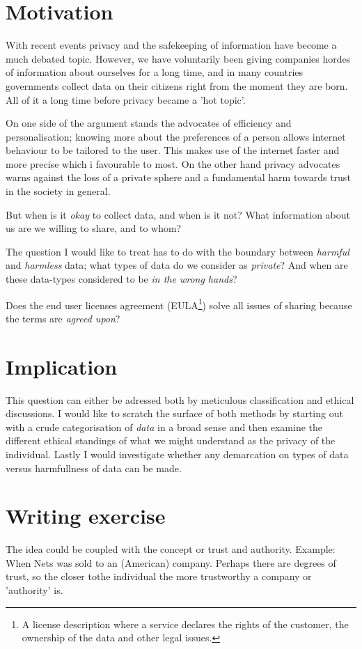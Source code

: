 \documentclass{article}
\begin{document}
\section{Motivation}
With recent events privacy and the safekeeping of information have become a
much debated topic. However, we have voluntarily been giving companies
hordes of information about ourselves for a long time, and in many
countries governments collect data on their citizens right from
the moment they are born.
All of it a long time before privacy became a 'hot topic'.

On one side of the argument stands the advocates of efficiency
and personalisation; knowing more about the preferences of a person
allows internet behaviour to be tailored to the user.
This makes use of the internet faster and more precise which i
favourable to most.
On the other hand privacy advocates warns against the loss of a
private sphere and a fundamental harm towards trust in the
society in general.

But when is it \textit{okay} to collect data, and when is it not?
What information about us are we willing to share, and to whom?

The question I would like to treat has to do with the boundary between 
\textit{harmful} and \textit{harmless} data; what types of data do we
consider as \textit{private}? And when are these data-types considered 
to be \textit{in the wrong hands}? 

Does the end user licenses agreement (EULA\footnote{A license description
where a service declares the rights of the customer, the ownership of
the data and other legal issues.}) solve all issues of sharing because
the terms are \textit{agreed upon}?

\section{Implication}
This question can either be adressed both by meticulous
classification and ethical discussions. I would like to scratch the 
surface of both methods by starting out with a crude categorisation 
of \textit{data} in a broad sense and then examine the different
ethical standings of what we might understand as the privacy of the
individual. Lastly I would investigate whether any demarcation
on types of data versus harmfullness of data can be made.

\section{Writing exercise}
The idea could be coupled with the concept or trust and authority. 
Example: When Nets was sold to an (American) company. Perhaps there are
degrees of trust, so the closer tothe individual the more trustworthy 
a company or 'authority' is. 
\end{document}

